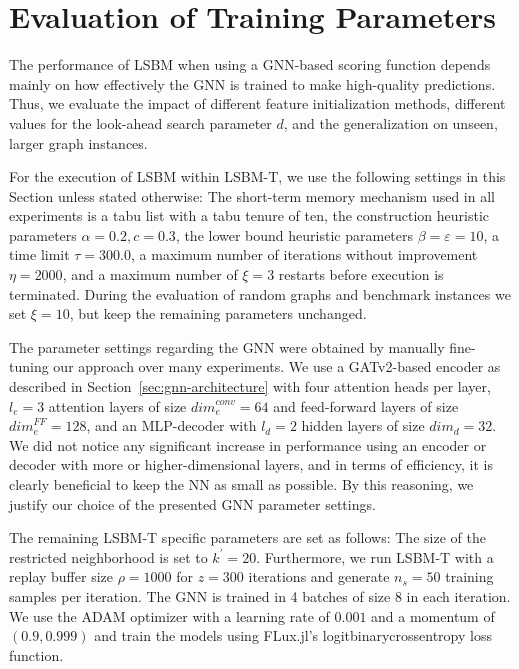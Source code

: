 \documentclass[draft,final]{vutinfth} %
\begin{document}
\section{Evaluation of Training Parameters}\label{sec:lsbm-t}

The performance of LSBM when using a GNN-based scoring function depends mainly on how effectively the GNN is trained to make high-quality predictions. 
Thus, we evaluate the impact of different feature initialization methods, different values for the look-ahead search parameter $d$, and the generalization on unseen, larger graph instances. 

For the execution of LSBM within LSBM-T, we use the following settings in this Section unless stated otherwise: The short-term memory mechanism used in all experiments is a tabu list with a tabu tenure of ten, the construction heuristic parameters $\alpha=0.2, c=0.3$, the lower bound heuristic parameters $\beta=\varepsilon=10$, a time limit $\tau=300.0$, a maximum number of iterations without improvement $\eta=2000$, and a maximum number of $\xi = 3$ restarts before execution is terminated. 
During the evaluation of random graphs and benchmark instances we set $\xi = 10$, but keep the remaining parameters unchanged. 

The parameter settings regarding the GNN were obtained by manually fine-tuning our approach over many experiments. We use a GATv2-based encoder as described in Section~\ref{sec:gnn-architecture} with four attention heads per layer, $l_e = 3$ attention layers of size $\mathit{dim}^{conv}_e = 64$ and feed-forward layers of size $\mathit{dim}^{FF}_e = 128$, and an MLP-decoder with $l_d=2$ hidden layers of size $\mathit{dim}_d = 32$. We did not notice any significant increase in performance using an encoder or decoder with more or higher-dimensional layers, and in terms of efficiency, it is clearly beneficial to keep the NN as small as possible. By this reasoning, we justify our choice of the presented GNN parameter settings. 

The remaining LSBM-T specific parameters are set as follows: The size of the restricted neighborhood is set to $k^\prime = 20$.
Furthermore, we run LSBM-T with a replay buffer size $\rho=1000$ for $z=300$ iterations and generate $n_s = 50$ training samples per iteration. The GNN is trained in 4 batches of size $8$ in each iteration. We use the ADAM optimizer with a learning rate of $0.001$ and a momentum of $(0.9, 0.999)$ and train the models using FLux.jl's logitbinarycrossentropy loss function. 
\end{document}
